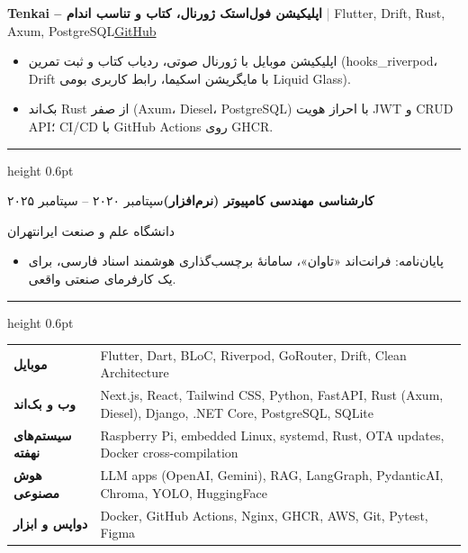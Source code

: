 \documentclass[10pt,a4paper]{article}
\newcommand{\en}[1]{\textenglish{#1}}
\renewcommand{\section}[1]{%
  \vspace{6pt}{\bfseries\color{accent}#1}\par\nointerlineskip\vspace{1.5pt}%
  {\color{accent}\hrule height 0.6pt}\vspace{3pt}}
\newcommand{\entry}[4]{%
  \vspace{3pt}\textbf{#1}\hfill #3\par
  #2\hfill #4\par\vspace{1pt}}
\newcommand{\project}[3]{%
  \vspace{3pt}\textbf{#1} \textcolor{gray}{|} {\small #2}\hfill #3\par\vspace{1pt}}
\begin{document}
\project{\en{Tenkai} – اپلیکیشن فول‌استک ژورنال، کتاب و تناسب اندام}{\en{Flutter, Drift, Rust, Axum, PostgreSQL}}{\en{\href{https://github.com/Hazhir2002/tenkai}{GitHub}}}
\begin{itemize}
  \item اپلیکیشن موبایل با ژورنال صوتی، ردیاب کتاب و ثبت تمرین (\en{hooks\_riverpod}، \en{Drift} با مایگریشن اسکیما، رابط کاربری بومی \en{Liquid Glass}).
  \item بک‌اند \en{Rust} از صفر (\en{Axum}، \en{Diesel}، \en{PostgreSQL}) با احراز هویت \en{JWT} و \en{CRUD API}؛ \en{CI/CD} با \en{GitHub Actions} روی \en{GHCR}.
\end{itemize}

\section{تحصیلات}
\entry{کارشناسی مهندسی کامپیوتر (نرم‌افزار)}{دانشگاه علم و صنعت ایران}{سپتامبر ۲۰۲۰ – سپتامبر ۲۰۲۵}{تهران}
\begin{itemize}
  \item پایان‌نامه: فرانت‌اند «تاوان»، سامانهٔ برچسب‌گذاری هوشمند اسناد فارسی، برای یک کارفرمای صنعتی واقعی.
\end{itemize}

\section{مهارت‌ها}
\begin{tabular}{@{}p{2.8cm}p{14.4cm}@{}}
  \textbf{موبایل} & \en{Flutter, Dart, BLoC, Riverpod, GoRouter, Drift, Clean Architecture} \\
  \textbf{وب و بک‌اند} & \en{Next.js, React, Tailwind CSS, Python, FastAPI, Rust (Axum, Diesel), Django, .NET Core, PostgreSQL, SQLite} \\
  \textbf{سیستم‌های نهفته} & \en{Raspberry Pi, embedded Linux, systemd, Rust, OTA updates, Docker cross-compilation} \\
  \textbf{هوش مصنوعی} & \en{LLM apps (OpenAI, Gemini), RAG, LangGraph, PydanticAI, Chroma, YOLO, HuggingFace} \\
  \textbf{دواپس و ابزار} & \en{Docker, GitHub Actions, Nginx, GHCR, AWS, Git, Pytest, Figma} \\
\end{tabular}
\end{document}
